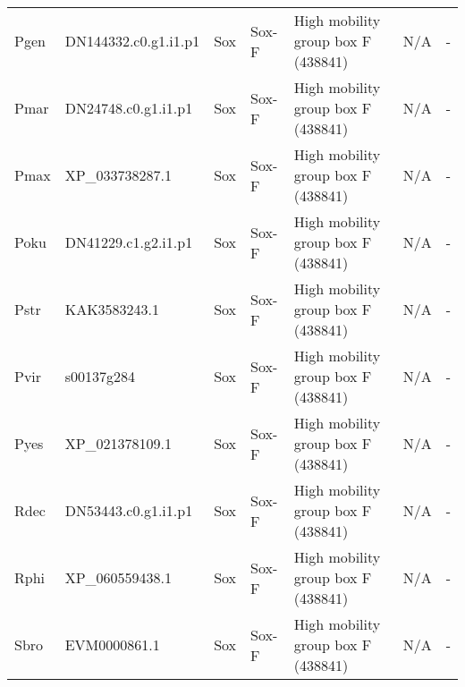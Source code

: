 \documentclass[../main.tex]{subfiles}
\begin{document}
\begin{landscape}
\begin{longtable}{lllllll}
		Pgen           & DN144332.c0.g1.i1.p1  & Sox            & Sox-F               & High mobility group box F (438841)          & N/A                                                                    & -                    \\
		Pmar           & DN24748.c0.g1.i1.p1   & Sox            & Sox-F               & High mobility group box F (438841)          & N/A                                                                    & -                    \\
		Pmax           & XP\_033738287.1       & Sox            & Sox-F               & High mobility group box F (438841)          & N/A                                                                    & -                    \\
		Poku           & DN41229.c1.g2.i1.p1   & Sox            & Sox-F               & High mobility group box F (438841)          & N/A                                                                    & -                    \\
		Pstr           & KAK3583243.1          & Sox            & Sox-F               & High mobility group box F (438841)          & N/A                                                                    & -                    \\
		Pvir           & s00137g284            & Sox            & Sox-F               & High mobility group box F (438841)          & N/A                                                                    & -                    \\
		Pyes           & XP\_021378109.1       & Sox            & Sox-F               & High mobility group box F (438841)          & N/A                                                                    & -                    \\
		Rdec           & DN53443.c0.g1.i1.p1   & Sox            & Sox-F               & High mobility group box F (438841)          & N/A                                                                    & -                    \\
		Rphi           & XP\_060559438.1       & Sox            & Sox-F               & High mobility group box F (438841)          & N/A                                                                    & -                    \\
		Sbro           & EVM0000861.1          & Sox            & Sox-F               & High mobility group box F (438841)          & N/A                                                                    & -                    \\

\end{longtable}
\end{landscape}
\end{document}
